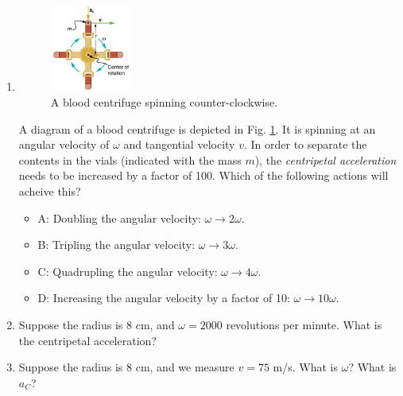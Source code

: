 \documentclass{article}
\begin{document}
\begin{enumerate}
\item 
\begin{figure}[ht]
\centering
\includegraphics[width=0.25\textwidth]{cent.png}
\caption{\label{fig:cent} A blood centrifuge spinning counter-clockwise.}
\end{figure}

A diagram of a blood centrifuge is depicted in Fig. \ref{fig:cent}.  It is spinning at an angular velocity of $\omega$ and tangential velocity $v$.  In order to separate the contents in the vials (indicated with the mass $m$), the \textit{centripetal acceleration} needs to be increased by a factor of 100.  Which of the following actions will acheive this?
\begin{itemize}
\item A: Doubling the angular velocity: $\omega \rightarrow 2\omega$.
\item B: Tripling the angular velocity: $\omega \rightarrow 3\omega$.
\item C: Quadrupling the angular velocity: $\omega \rightarrow 4\omega$.
\item D: Increasing the angular velocity by a factor of 10: $\omega \rightarrow 10\omega$.
\end{itemize}
\item Suppose the radius is 8 cm, and $\omega = 2000$ revolutions per minute.  What is the centripetal acceleration? \\ \vspace{2cm}
\item Suppose the radius is 8 cm, and we measure $v = 75$ m/s.  What is $\omega$?  What is $a_C$?
\end{enumerate}
\end{document}
